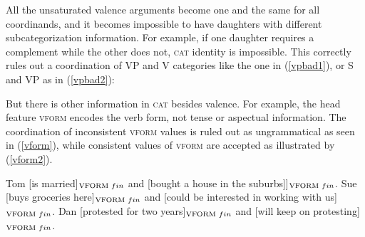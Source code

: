 \documentclass[output=paper]{langsci/langscibook}
\begin{document}
All the unsaturated valence arguments become one and the same for all coordinands, and it becomes impossible to have daughters with different subcategorization information. For example, if one daughter requires a complement while the other does not,
\textsc{cat} identity  is impossible. This correctly rules out  a coordination of  VP and V categories
like the one in (\ref{vpbad1}), or S and VP as in (\ref{vpbad2}):

\begin{exe}
\ex
\begin{xlista}
\label{vpbad1}
 
 \label{vpbad2}
\end{xlista}
\end{exe}

But there is other information in \textsc{cat} besides valence. For example, the head feature  \textsc{vform}  encodes the verb form, not tense or aspectual information. The coordination of inconsistent \textsc{vform} values is   ruled out as ungrammatical as seen
 in (\ref{vform}), while  consistent values of \textsc{vform} are accepted  as illustrated by (\ref{vform2}).

\begin{exe}
\ex
\begin{xlista}
 \end{xlista} \label{vform}
\end{exe}



\begin{exe}
\ex \begin{xlista}
  \ex Tom [is married]$_{\textup{\scriptsize VFORM} \,\, fin}$ and
                   [bought  a house in the suburbs]]$_{\textup{\scriptsize VFORM} \,\, fin}$.
   \ex Sue [buys groceries here]$_{\textup{\scriptsize VFORM} \,\, fin}$ and
                   [could be interested in working with us]$_{\textup{\scriptsize VFORM} \,\, fin}$.
   \ex Dan [protested for two years]$_{\textup{\scriptsize VFORM} \,\, fin}$ and
                   [will keep on protesting]$_{\textup{\scriptsize VFORM} \,\, fin}$.
\end{xlista}\label{vform2}
\end{exe}
\end{document}
